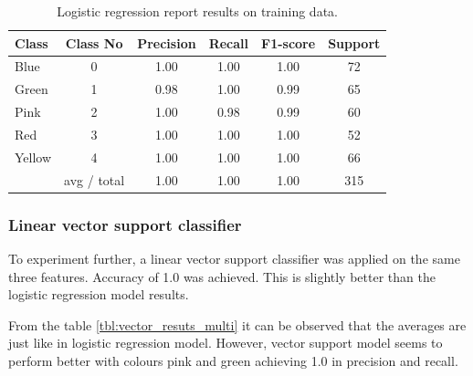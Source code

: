 \documentclass[11pt]{article}
\begin{document}
			\begin{center}
			  	\begin{table}[h]
			  	\centering
				\begin{tabular}[b]{| l | c | c | c | c | c |}
					\hline
					Class & Class No & Precision &  Recall & F1-score & Support  \\
		 			\hline
					  Blue  &  0  &    1.00   &   1.00   &   1.00    &    72 \\
			          Green &  1  &    0.98   &   1.00   &   0.99    &    65 \\
			          Pink  &  2   &    1.00   &   0.98   &   0.99    &    60 \\
			          Red  &   3   &    1.00   &   1.00   &   1.00    &    52 \\
			          Yellow & 4   &    1.00   &   1.00   &   1.00    &    66 \\
		  			\hline
					 & avg / total   &    1.00   &   1.00   &   1.00   &    315 \\
					\hline
				\end{tabular}
				\caption{Logistic regression report results on training data.}
				\label{tbl:logistic_resuts_multi}
				\end{table}
			\end{center}
			\vspace*{-1.3cm}

			\subsubsection{Linear vector support classifier}
				To experiment further, a linear vector support classifier was applied on the same three features. Accuracy of 1.0 was achieved. This is slightly better than the logistic regression model results. 

				From the table \ref{tbl:vector_resuts_multi} it can be observed that the averages are just like in logistic regression model. However, vector support model seems to perform better with colours pink and green achieving 1.0 in precision and recall. 
			
\end{document}
